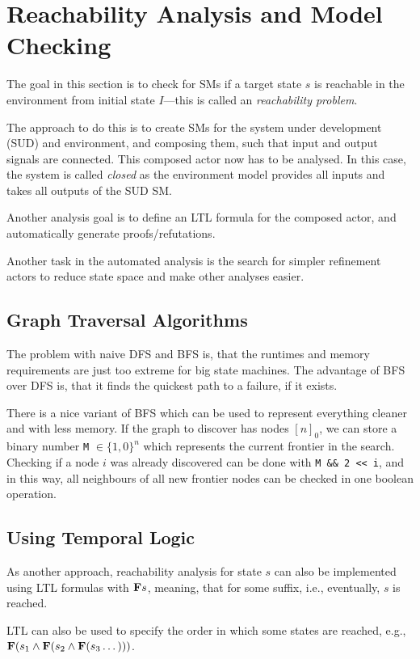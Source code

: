 \section{Reachability Analysis and Model Checking}
The goal in this section is to check for SMs if a target state \(s\) is reachable in the environment from initial state \(I\)---this is called an \emph{reachability problem}.

The approach to do this is to create SMs for the system under development (SUD) and environment, and composing them, such that input and output signals are connected.
This composed actor now has to be analysed.
In this case, the system is called \emph{closed} as the environment model provides all inputs and takes all outputs of the SUD SM.

Another analysis goal is to define an LTL formula for the composed actor, and automatically generate proofs/refutations.

Another task in the automated analysis is the search for simpler refinement actors to reduce state space and make other analyses easier.

\subsection{Graph Traversal Algorithms}
The problem with naive DFS and BFS is, that the runtimes and memory requirements are just too extreme for big state machines.
The advantage of BFS over DFS is, that it finds the quickest path to a failure, if it exists.

There is a nice variant of BFS which can be used to represent everything cleaner and with less memory.
If the graph to discover has nodes \([n]_0\), we can store a binary number \lstinline|M| \(\in \{1, 0\}^n\) which represents the current frontier in the search.
Checking if a node \(i\) was already discovered can be done with \lstinline|M && 2 << i|, and in this way, all neighbours of all new frontier nodes can be checked in one boolean operation.

\subsection{Using Temporal Logic}
As another approach, reachability analysis for state \(s\) can also be implemented using LTL formulas with \(\textbf{F} s\), meaning, that for some suffix, i.e., eventually, \(s\) is reached.

LTL can also be used to specify the order in which some states are reached, e.g., \(\textbf{F}(s_1 \wedge \textbf{F}(s_2 \wedge \textbf{F}(s_3 \dots)))\).

